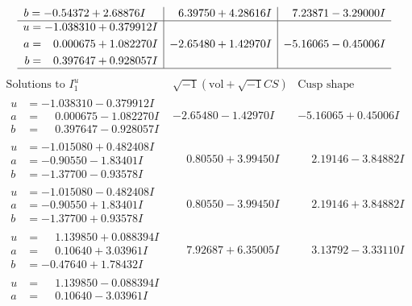 \documentclass[1p]{elsarticle_modified}
\theoremstyle{definition}
\newcommand{\I}{\sqrt{-1}}
\begin{document}
$$\begin{array}{c|c|c}
\begin{aligned}
b &= -0.54372 + 2.68876 I\end{aligned}
 & \phantom{-}6.39750 + 4.28616 I & \phantom{-}7.23871 - 3.29000 I \\ \hline\begin{aligned}
u &= -1.038310 + 0.379912 I \\
a &= \phantom{-}0.000675 + 1.082270 I \\
b &= \phantom{-}0.397647 + 0.928057 I\end{aligned}
 & -2.65480 + 1.42970 I & -5.16065 - 0.45006 I\\
 \hline 
 \end{array}$$\newpage$$\begin{array}{c|c|c}  
\text{Solutions to }I^u_{1}& \I (\text{vol} + \sqrt{-1}CS) & \text{Cusp shape}\\
 \hline 
\begin{aligned}
u &= -1.038310 - 0.379912 I \\
a &= \phantom{-}0.000675 - 1.082270 I \\
b &= \phantom{-}0.397647 - 0.928057 I\end{aligned}
 & -2.65480 - 1.42970 I & -5.16065 + 0.45006 I \\ \hline\begin{aligned}
u &= -1.015080 + 0.482408 I \\
a &= -0.90550 - 1.83401 I \\
b &= -1.37700 - 0.93578 I\end{aligned}
 & \phantom{-}0.80550 + 3.99450 I & \phantom{-}2.19146 - 3.84882 I \\ \hline\begin{aligned}
u &= -1.015080 - 0.482408 I \\
a &= -0.90550 + 1.83401 I \\
b &= -1.37700 + 0.93578 I\end{aligned}
 & \phantom{-}0.80550 - 3.99450 I & \phantom{-}2.19146 + 3.84882 I \\ \hline\begin{aligned}
u &= \phantom{-}1.139850 + 0.088394 I \\
a &= \phantom{-}0.10640 + 3.03961 I \\
b &= -0.47640 + 1.78432 I\end{aligned}
 & \phantom{-}7.92687 + 6.35005 I & \phantom{-}3.13792 - 3.33110 I \\ \hline\begin{aligned}
u &= \phantom{-}1.139850 - 0.088394 I \\
a &= \phantom{-}0.10640 - 3.03961 I \\

\end{aligned}
\end{array}$$
\end{document}

